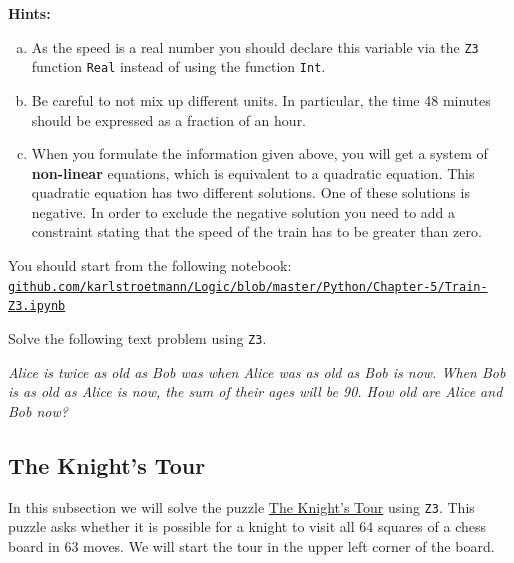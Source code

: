\noindent
\textbf{Hints:}
\begin{enumerate}[(a)]
\item As the speed is a real number you should declare this variable via the \texttt{Z3} function \texttt{Real} instead of using
      the function \texttt{Int}.
\item Be careful to not mix up different units. In particular, the time 48 minutes should be expressed as a
      fraction of an hour.
\item When you formulate the information given above, you will get a system of \textbf{non-linear} equations,
      which is equivalent to a quadratic equation.  This quadratic equation has two different solutions.
      One of these solutions is negative.  In order to exclude the negative solution you need to add a
      constraint stating that the speed of the train has to be greater than zero.
\end{enumerate}
You should start from the following notebook:
\\[0.2cm]
\hspace*{0.8cm}
\href{https://github.com/karlstroetmann/Logic/blob/master/Python/Chapter-5/Train-Z3.ipynb}{\texttt{github.com/karlstroetmann/Logic/blob/master/Python/Chapter-5/Train-Z3.ipynb}}
\eox

\exerciseEng
Solve the following text problem using \texttt{Z3}.

\begin{minipage}[b]{0.9\linewidth}
\textsl{Alice is twice as old as Bob was when Alice was as old as Bob is now. When Bob is as old as Alice is now, the sum of their ages will be 90. How old are Alice and Bob now?}
\end{minipage} 
\eox

\subsection{The Knight's Tour}
In this subsection we will solve the puzzle \href{https://en.wikipedia.org/wiki/Knight%27s_tour}{The Knight's Tour} 
using \texttt{Z3}.  This puzzle asks whether it is possible for a knight to visit all 64 squares of a chess board
in 63 moves.  We will start the tour in the upper left corner of the board.  

